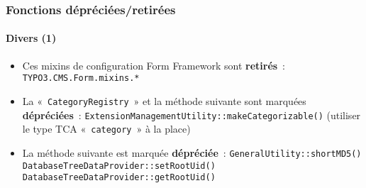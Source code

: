 %

\begin{frame}[fragile]
	\frametitle{Fonctions dépréciées/retirées}
	\framesubtitle{Divers (1)}


	\begin{itemize}
		\item Ces mixins de configuration Form Framework sont \textbf{retirés}~:\newline
			\small\texttt{TYPO3.CMS.Form.mixins.*}\normalsize
		\item La «~\texttt{CategoryRegistry}~» et la méthode suivante sont marquées
			\textbf{dépréciées}~:\newline
			\texttt{ExtensionManagementUtility::makeCategorizable()}\newline
			\small(utiliser le type TCA «~\texttt{category}~» à la place)\normalsize
		\item La méthode suivante est marquée \textbf{dépréciée}~:\newline
			\small
				\texttt{GeneralUtility::shortMD5()}\newline
				\texttt{DatabaseTreeDataProvider::setRootUid()}\newline
				\texttt{DatabaseTreeDataProvider::getRootUid()}
			\normalsize
	\end{itemize}

\end{frame}

